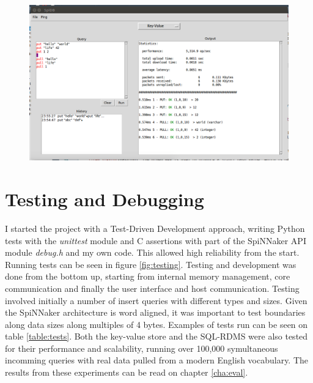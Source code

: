 \begin{figure}
\center
  \includegraphics[width=1\linewidth, natwidth=1036, natheight=622]{images/GUI.png}
  \label{fig:gui}
\end{figure}

\section{Testing and Debugging}
I started the project with a Test-Driven Development approach, writing Python tests with the \textit{unittest} module and C assertions with part of the SpiNNaker API module \textit{debug.h} and my own code. This allowed high reliability from the start. Running tests can be seen in figure \ref{fig:testing}. Testing and development was done from the bottom up, starting from internal memory management, core communication and finally the user interface and host communication.
Testing involved initially a number of insert queries with different types and sizes. Given the SpiNNaker architecture is word aligned, it was important to test boundaries along data sizes along multiples of 4 bytes. Examples of tests run can be seen on table \ref{table:tests}.
Both the key-value store and the SQL-RDMS were also tested for their performance and scalability, running over 100,000 symultaneous incomming queries with real data pulled from a modern English vocabulary. The results from these experiments can be read on chapter \ref{cha:eval}.

